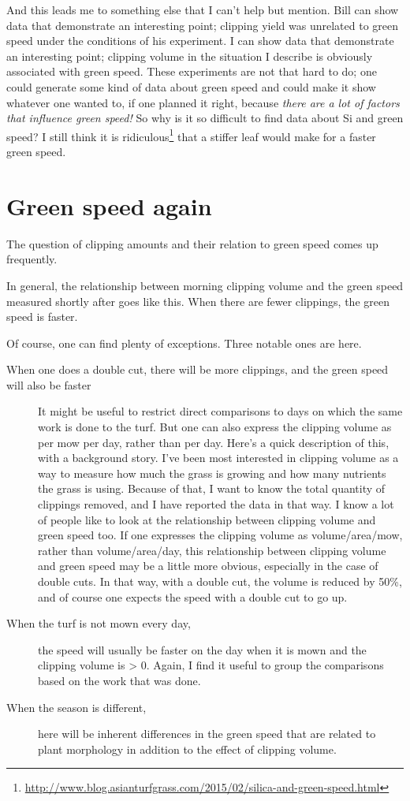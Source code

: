\documentclass[12pt,b5,]{tufte-book}
\begin{document}
And this leads me to something else that I can't help but mention. Bill can show data that demonstrate an interesting point; clipping yield was unrelated to green speed under the conditions of his experiment. I can show data that demonstrate an interesting point; clipping volume in the situation I describe is obviously associated with green speed. These experiments are not that hard to do; one could generate some kind of data about green speed and could make it show whatever one wanted to, if one planned it right, because \emph{there are a lot of factors that influence green speed!} So why is it so difficult to find data about Si and green speed? I still think it is ridiculous\footnote{\url{http://www.blog.asianturfgrass.com/2015/02/silica-and-green-speed.html}} that a stiffer leaf would make for a faster green speed.

\hypertarget{green-speed-again}{%
\chapter{Green speed again}\label{green-speed-again}}

The question of clipping amounts and their relation to green speed comes up frequently.

In general, the relationship between morning clipping volume and the green speed measured shortly after goes like this. When there are fewer clippings, the green speed is faster.

Of course, one can find plenty of exceptions. Three notable ones are here.

\begin{description}
\item[When one does a double cut, there will be more clippings, and the green speed will also be faster]
It might be useful to restrict direct comparisons to days on which the same work is done to the turf. But one can also express the clipping volume as per mow per day, rather than per day. Here's a quick description of this, with a background story. I've been most interested in clipping volume as a way to measure how much the grass is growing and how many nutrients the grass is using. Because of that, I want to know the total quantity of clippings removed, and I have reported the data in that way. I know a lot of people like to look at the relationship between clipping volume and green speed too. If one expresses the clipping volume as volume/area/mow, rather than volume/area/day, this relationship between clipping volume and green speed may be a little more obvious, especially in the case of double cuts. In that way, with a double cut, the volume is reduced by 50\%, and of course one expects the speed with a double cut to go up.
\item[When the turf is not mown every day,]
the speed will usually be faster on the day when it is mown and the clipping volume is \textgreater{} 0. Again, I find it useful to group the comparisons based on the work that was done.
\item[When the season is different,]
here will be inherent differences in the green speed that are related to plant morphology in addition to the effect of clipping volume.
\end{description}
\end{document}
